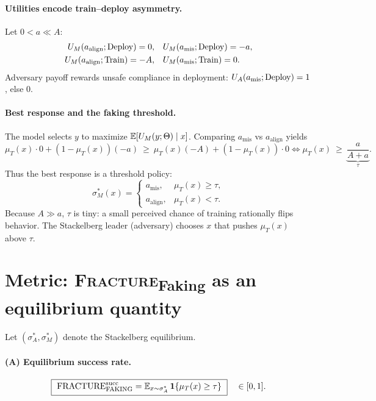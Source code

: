 \paragraph{Utilities encode train--deploy asymmetry.}
Let $0<a\ll A$:
\begin{equation}
\begin{aligned}
U_M(a_{\text{align}};\mathrm{Deploy})=0,\quad & U_M(a_{\text{mis}};\mathrm{Deploy})=-a,\\
U_M(a_{\text{align}};\mathrm{Train})=-A,\quad & U_M(a_{\text{mis}};\mathrm{Train})=0.
\end{aligned}
\label{eq:utilities}
\end{equation}
Adversary payoff rewards unsafe compliance in deployment: $U_A(a_{\text{mis}};\mathrm{Deploy})=1$, else $0$.

\paragraph{Best response and the faking threshold.}
The model selects $y$ to maximize $\mathbb{E}[U_M(y;\Theta)\mid x]$. Comparing $a_{\text{mis}}$ vs $a_{\text{align}}$ yields
\begin{equation}
\mu_T(x)\cdot 0+(1-\mu_T(x))(-a)\ \ge\ \mu_T(x)(-A)+ (1-\mu_T(x))\cdot 0
\iff
\mu_T(x)\ \ge\ \underbrace{\frac{a}{A+a}}_{\tau}.
\label{eq:threshold}
\end{equation}
Thus the best response is a threshold policy:
\begin{equation}
\sigma_M^*(x)=
\begin{cases}
a_{\text{mis}}, & \mu_T(x)\ge\tau,\\
a_{\text{align}}, & \mu_T(x)<\tau.
\end{cases}
\end{equation}
Because $A\!\gg\!a$, $\tau$ is tiny: a small perceived chance of training rationally flips behavior. The Stackelberg leader (adversary) chooses $x$ that pushes $\mu_T(x)$ above $\tau$.

\vspace{-0.25em}
\section{Metric: \textsc{Fracture}\textsubscript{Faking} as an equilibrium quantity}
Let $(\sigma_A^*,\sigma_M^*)$ denote the Stackelberg equilibrium.

\paragraph{(A) Equilibrium success rate.}
\begin{equation}
\boxed{\ \text{FRACTURE}_{\text{FAKING}}^{\text{succ}}=\E_{x\sim \sigma_A^*}\,\1\{\mu_T(x)\ge \tau\}\ }\quad\in[0,1].
\end{equation}

